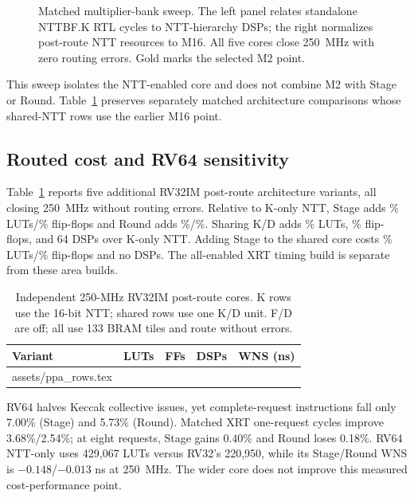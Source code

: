\documentclass[conference,letterpaper]{IEEEtran}
\makeatletter
\newcommand{\tablerows}[1]{\@@input #1 }
\makeatother
\begin{document}
\begin{figure}[t]
\centering
\caption{Matched multiplier-bank sweep. The left panel relates standalone
NTTBF.K RTL cycles to NTT-hierarchy DSPs; the right normalizes post-route
NTT resources to M16. All five cores close 250~MHz with zero routing errors.
Gold marks the selected M2 point.}
\label{fig:nttbank}
\end{figure}

This sweep isolates the NTT-enabled core and does not combine M2 with
Stage or Round. Table~\ref{tab:ppa} preserves separately matched
architecture comparisons whose shared-NTT rows use the earlier M16 point.

\subsection{Routed cost and RV64 sensitivity}
Table~\ref{tab:ppa} reports five additional RV32IM post-route architecture
variants, all
closing 250~MHz without routing errors. Relative to K-only NTT, Stage adds
\StageLutPct{}\% LUTs/\StageFfPct{}\% flip-flops and Round adds
\RoundLutPct{}\%/\RoundFfPct{}\%. Sharing K/D adds \SharedLutPct{}\% LUTs,
\SharedFfPct{}\% flip-flops, and 64 DSPs over K-only NTT. Adding Stage to
the shared core costs \SharedStageLutPct{}\% LUTs/\SharedStageFfPct{}\%
flip-flops and no DSPs. The all-enabled XRT timing build is separate from
these area builds.

\begin{table}[t]
\caption{Independent 250-MHz RV32IM post-route cores. K rows use the
16-bit NTT; shared rows use one K/D unit. F/D are off; all use 133 BRAM
tiles and route without errors.}
\label{tab:ppa}
\centering\small
\begin{tabular}{@{}lrrrr@{}}
\toprule
Variant & LUTs & FFs & DSPs & WNS (ns) \\
\midrule
\tablerows{assets/ppa_rows.tex}
\bottomrule
\end{tabular}
\end{table}

RV64 halves Keccak collective issues, yet complete-request instructions
fall only 7.00\% (Stage) and 5.73\% (Round). Matched XRT one-request cycles
improve 3.68\%/2.54\%; at eight requests, Stage gains 0.40\% and Round loses
0.18\%. RV64 NTT-only uses 429,067 LUTs versus RV32's 220,950, while its
Stage/Round WNS is $-0.148$/$-0.013$ ns at 250~MHz. The wider core does not
improve this measured cost-performance point.
\end{document}
